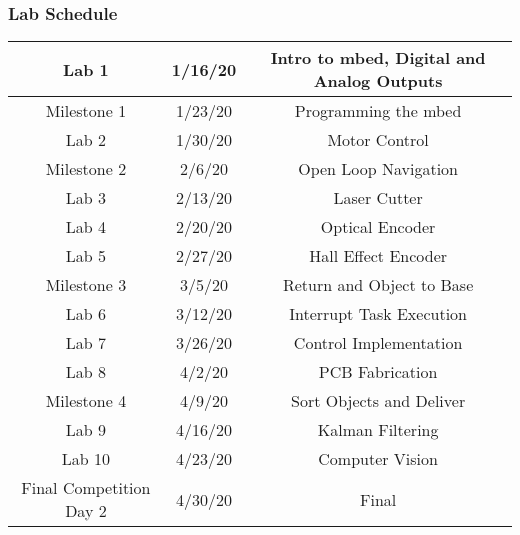 \documentclass[12pt,letterpaper,onecolumn]{report}
\begin{document}
\subsubsection*{Lab Schedule}
\begin{center}
\begin{tabular}{|c|c|c|}
\hline 
Lab 1 & 1/16/20 & Intro to mbed, Digital and Analog Outputs \\ 
\hline 
Milestone 1 & 1/23/20 & Programming the mbed \\ 
\hline 
Lab 2 & 1/30/20 & Motor Control \\ 
\hline 
Milestone 2 & 2/6/20 & Open Loop Navigation \\ 
\hline 
Lab 3 & 2/13/20 & Laser Cutter \\ 
\hline 
Lab 4 & 2/20/20 & Optical Encoder \\ 
\hline 
Lab 5 & 2/27/20 & Hall Effect Encoder \\ 
\hline 
Milestone 3 & 3/5/20 & Return and Object to Base \\ 
\hline 
Lab 6 & 3/12/20 & Interrupt Task Execution \\ 
\hline 
Lab 7 & 3/26/20 & Control Implementation\\ 
\hline 
Lab 8 & 4/2/20 & PCB Fabrication\\ 
\hline 
Milestone 4 & 4/9/20 & Sort Objects and Deliver\\ 
\hline 
Lab 9 & 4/16/20 & Kalman Filtering\\ 
\hline 
Lab 10 & 4/23/20 & Computer Vision\\ 
\hline 
Final Competition Day 2 & 4/30/20 & Final\\ 
\hline
\end{tabular} 
\end{center}
\end{document}

